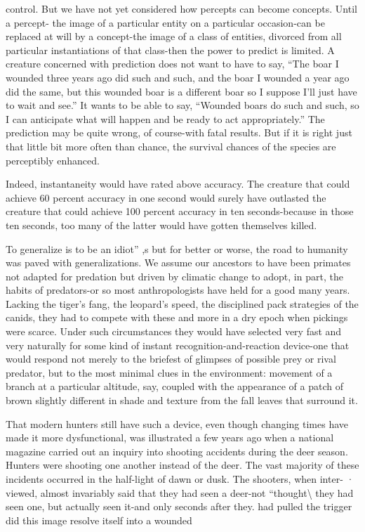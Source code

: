 control. But we have not yet considered how percepts can become concepts. Until a percept- the image of a particular entity on a par\-ticular occasion-can be replaced at will by a concept-the image of a class of entities, divorced from all particular instantiations of that class-then the power to predict is limited. A creature concerned with prediction does not want to have to say, ``The boar I wounded three years ago did such and such, and the boar I wounded a year ago did the same, but this wounded boar is a different boar so I suppose I'll just have to wait and see.'' It wants to be able to say, ``Wounded boars do such and such, so I can anticipate what will happen and be ready to act appropriately.'' The prediction may be quite wrong, of course-with fatal results. But if it is right just that little bit more often than chance, the survival chances of the species are perceptibly enhanced.

Indeed, instantaneity would have rated above accuracy. The creature that could achieve 60 percent accuracy in one second would surely have outlasted the creature that could achieve 100 percent accuracy in ten seconds-because in those ten seconds, too many of the latter would have gotten themselves killed.

{\textquotedbl}To generalize is to be an idiot'' \citep{Blake1808},s but for better or worse, the road to humanity was paved with generalizations. We assume our ancestors to have been primates not adapted for predation but driven by climatic change to adopt, in part, the habits of preda\-tors-or so most anthropologists have held for a good many years. Lacking the tiger's fang, the leopard's speed, the disciplined pack strategies of the canids, they had to compete with these and more in a dry epoch when pickings were scarce. Under such circumstances they would have selected very fast and very naturally for some kind of instant recognition-and-reaction device-one that would respond not merely to the briefest of glimpses of possible prey or rival predator, but to the most minimal clues in the environment: movement of a branch at a particular altitude, say, coupled with the appearance of a patch of brown slightly different in shade and texture from the fall leaves that surround it.


That modern hunters still have such a device, even though changing times have made it more dysfunctional, was illustrated a few years ago when a national magazine carried out an inquiry into shooting accidents during the deer season. Hunters were shooting one another instead of the deer. The vast majority of these incidents oc\-curred in the half-light of dawn or dusk. The shooters, when inter- · viewed, almost invariably said that they had seen a deer-not ``thought{\textquotedbl}{\textbackslash} they had seen one, but actually seen it-and only seconds after they. had pulled the trigger did this image resolve itself into a wounded

